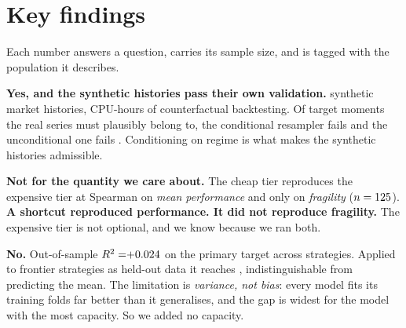 \documentclass[11pt,a4paper]{article}
\begin{document}
\begin{abstract}
\medskip\noindent
Fragility itself proved generator-independent, every frontier arm's median landing within a sixth
of the local corpus's, while one measured pathology did not recur at all. We report our own two
corrections in the results, because the first version of our headline number was better and wrong.
\end{abstract}

\vspace{0.2em}

\section*{Key findings}

Each number answers a question, carries its sample size, and is tagged with the population it
describes.

\begin{finding}[title={1.\ \ Can we test a strategy against histories that never happened?
  \hfill\tagmethod}]
\textbf{Yes, and the synthetic histories pass their own validation.} \rsTierOnePaths{} synthetic
market histories, \rsTierOneCpuHours{} CPU-hours of counterfactual backtesting. Of
\rsNMoments{} target moments the real series must plausibly belong to, the conditional resampler
fails \textbf{\rsMomentsFailedConditional{}} and the unconditional one fails
\rsMomentsFailedUnconditional{}. Conditioning on regime is what makes the synthetic histories
admissible.
\end{finding}

\begin{finding}[title={2.\ \ Can we do it cheaply instead? \hfill\tagmethod}]
\textbf{Not for the quantity we care about.} The cheap tier reproduces the expensive tier at
Spearman \rsTierAgreementMeanSharpe{} on \emph{mean performance} and only
\rsTierAgreementFragility{} on \emph{fragility} ($n=125{}$).
\textbf{A shortcut reproduced performance. It did not reproduce fragility.} The expensive tier is
not optional, and we know because we ran both.
\end{finding}

\begin{finding}[title={3.\ \ Can fragility be predicted without running the test?
  \hfill\tagindep}]
\textbf{No.} Out-of-sample $R^2 = \rsPathsRawBestRsquared{}$ on the primary target across
\rsPredictorRows{} strategies. Applied to \rsGvPredPooledN{} frontier strategies as held-out data
it reaches \rsGvPredPooledRsq{}, indistinguishable from predicting the mean. The limitation is
\emph{variance, not bias}: every model fits its training folds far better than it generalises, and
the gap is widest for the model with the most capacity. So we added no capacity.
\end{finding}
\end{document}
